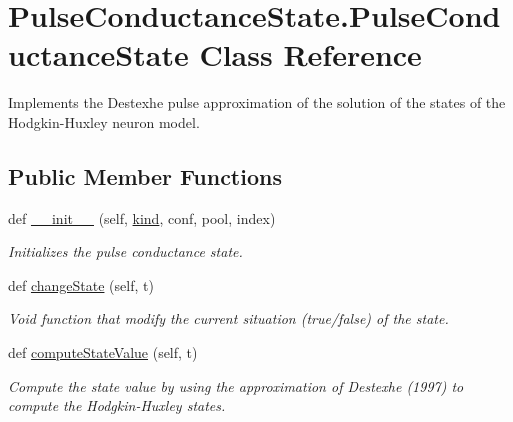 \hypertarget{class_pulse_conductance_state_1_1_pulse_conductance_state}{}\section{Pulse\+Conductance\+State.\+Pulse\+Conductance\+State Class Reference}
\label{class_pulse_conductance_state_1_1_pulse_conductance_state}


Implements the Destexhe pulse approximation of the solution of the states of the Hodgkin-\/\+Huxley neuron model.  


\subsection*{Public Member Functions}
\begin{DoxyCompactItemize}
\item 
def \hyperlink{class_pulse_conductance_state_1_1_pulse_conductance_state_a8105133dfad3442af4c6996aa21a4776}{\+\_\+\+\_\+init\+\_\+\+\_\+} (self, \hyperlink{class_pulse_conductance_state_1_1_pulse_conductance_state_a53d237daaa4815ad375e2377da89845e}{kind}, conf, pool, index)
\begin{DoxyCompactList}\small\item\em Initializes the pulse conductance state. \end{DoxyCompactList}\item 
def \hyperlink{class_pulse_conductance_state_1_1_pulse_conductance_state_aefa0c1896447406edf39420111e19a82}{change\+State} (self, t)
\begin{DoxyCompactList}\small\item\em Void function that modify the current situation (true/false) of the state. \end{DoxyCompactList}\item 
def \hyperlink{class_pulse_conductance_state_1_1_pulse_conductance_state_ac4fa668247190566ffc9bccda61dcd81}{compute\+State\+Value} (self, t)
\begin{DoxyCompactList}\small\item\em Compute the state value by using the approximation of Destexhe (1997) to compute the Hodgkin-\/\+Huxley states. \end{DoxyCompactList}\end{DoxyCompactItemize}
